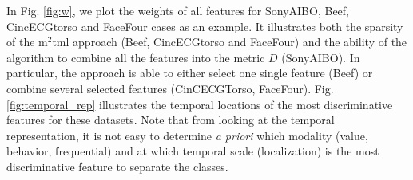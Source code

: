 \noindent In Fig. \ref{fig:w}, we plot the weights of all features for SonyAIBO, Beef, CincECGtorso and FaceFour cases as an example. It illustrates both the sparsity of the {\sc m}$^2${\sc tml} approach (Beef, CincECGtorso and FaceFour) and the ability of the algorithm to combine all the features into the metric $D$ (SonyAIBO). In particular, the approach is able to either select one single feature (Beef) or combine several selected features (CinCECGTorso, FaceFour). Fig. \ref{fig:temporal_rep} illustrates the temporal locations of the most discriminative features for these datasets. Note that from looking at the temporal representation, it is not easy to determine \textit{a priori} which modality (value, behavior, frequential) and at which temporal scale (localization) is the most discriminative feature to separate the classes.

